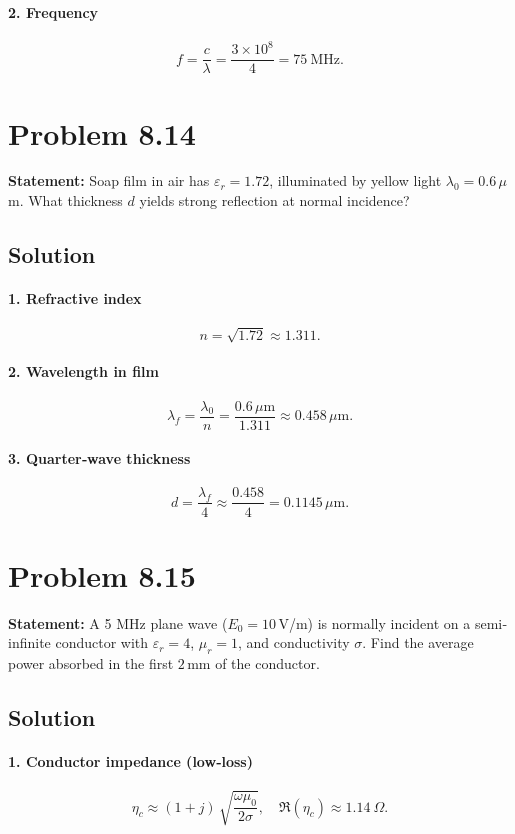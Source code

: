\paragraph{2. Frequency}
\[
f = \frac{c}{\lambda} = \frac{3\times10^8}{4} = 75\ \mathrm{MHz}.
\]

\section*{Problem 8.14}
\textbf{Statement:} Soap film in air has $\varepsilon_r=1.72$, illuminated by yellow light $\lambda_0=0.6\,\mu$m. What thickness $d$ yields strong reflection at normal incidence?

\subsection*{Solution}
\paragraph{1. Refractive index}
\[
n = \sqrt{1.72} \approx 1.311.
\]
\paragraph{2. Wavelength in film}
\[
\lambda_f = \frac{\lambda_0}{n} = \frac{0.6\,\mu\mathrm m}{1.311} \approx 0.458\,\mu\mathrm m.
\]
\paragraph{3. Quarter‐wave thickness}
\[
d = \frac{\lambda_f}{4} \approx \frac{0.458}{4} = 0.1145\,\mu\mathrm m.
\]

\section*{Problem 8.15}
\textbf{Statement:} A 5 MHz plane wave ($E_0=10\,$V/m) is normally incident on a semi‐infinite conductor with $\varepsilon_r=4$, $\mu_r=1$, and conductivity $\sigma$. Find the average power absorbed in the first $2\,$mm of the conductor.

\subsection*{Solution}
\paragraph{1. Conductor impedance (low‐loss)}
\[
\eta_c \approx (1+j)\,\sqrt{\frac{\omega\mu_0}{2\sigma}},
\quad
\Re(\eta_c)\approx 1.14\ \Omega.
\]
